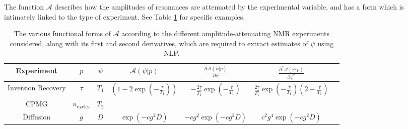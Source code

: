 The function $\mathcal{A}$ describes how the amplitudes of resonances are
attenuated by the experimental variable, and has a form which is intimately
linked to the type of experiment. See Table \ref{tab:seq-equations} for
specific examples.
\begin{table}
    \begin{center}
        \begin{tabular}{ccccccc}
            \hline
            Experiment &
            $p$ &
            $\psi$ &
            $\mathcal{A}(\psi | p)$ &
            $\frac{\partial \mathcal{A}(\psi | p)}{\partial \psi}$ &
            $\frac{\partial^2 \mathcal{A}(\psi | p)}{\partial \psi^2}$ \\ \hline
            Inversion Recovery &
            $\tau$ &
            $T_1$ &
            $\left(1 - 2 \exp \left(-\frac{\tau}{T_{1}}\right)\right)$ &
            $-\frac{2 \tau}{T_1^2} \exp\left(-\frac{\tau}{T_1}\right)$ &
            $\frac{2 \tau}{T_1^3} \exp\left(-\frac{\tau}{T_1}\right)\left(2 - \frac{\tau}{T_1}\right)$\\
            \acs{CPMG} &
            $n_{\textrm{cycles}}$ &
            $T_2$ &
            \note{?} &
            \note{?} &
            \note{?} \\
            Diffusion &
            $g$ &
            $D$ &
            $\exp\left(-c g^2 D\right)$ &
            $-c g^2 \exp\left(-c g^2 D\right)$ &
            $c^2 g^4 \exp\left(-c g^2 D\right)$ \\
            \hline
       \end{tabular}
       \caption[
           The various functional forms of $\mathcal{A}$ according to the
           different amplitude-attenuating NMR experiments considered.
       ]
       {
           The various functional forms of $\mathcal{A}$ according to the
           different amplitude-attenuating NMR experiments considered, along
           with its first and second derivatives, which are required to extract
           estimates of $\psi$ using \ac{NLP}.
       }
       \label{tab:seq-equations}
    \end{center}
\end{table}

